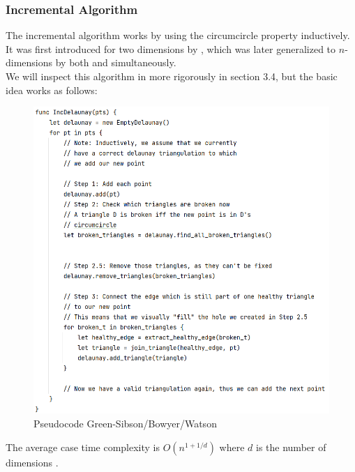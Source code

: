 \subsubsection{Incremental Algorithm}
The incremental algorithm works by using the circumcircle property inductively. It was first introduced for two dimensions by \cite{Green1978}, which was later generalized to $n$-dimensions by both \cite{Bowyer1981} and \cite{Watson1981} simultaneously.\\
We will inspect this algorithm in more rigorously in section 3.4, but the basic idea works as follows:
\begin{figure}[H]
    \centering
    \includegraphics[width=\textwidth]{delaunayPseudocode.png}
    \caption{Pseudocode Green-Sibson/Bowyer/Watson}
    \label{fig:my_label}
\end{figure}
The average case time complexity is $O(n^{1 + 1/d})$ where $d$ is the number of dimensions \cite{Bowyer1981}.
